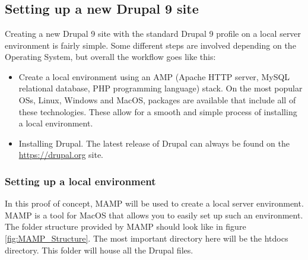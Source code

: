 
\lstset{
	basicstyle=\ttfamily,
	columns=fullflexible,
	frame=single,
	breaklines=true
}

\chapter{}
\label{ch:proofofconcept}

\section{Setting up a new Drupal 9 site}

Creating a new Drupal 9 site with the standard Drupal 9 profile on a local server environment is fairly simple. Some different steps are involved depending on the Operating System, but overall the workflow goes like this: 
\begin{itemize}
	\item Create a local environment using an AMP (Apache HTTP server, MySQL relational database, PHP programming language) stack. On the most popular OSs, Linux, Windows and MacOS, packages are available that include all of these technologies. These allow for a smooth and simple process of installing a local environment.
	\item Installing Drupal. The latest release of Drupal can always be found on the \url{https://drupal.org} site.
\end{itemize}

\subsection{Setting up a local environment}

In this proof of concept, MAMP will be used to create a local server environment. MAMP is a tool for MacOS that allows you to easily set up such an environment. The folder structure provided by MAMP should look like in figure \ref{fig:MAMP_Structure}. The most important directory here will be the htdocs directory. This folder will house all the Drupal files. 

